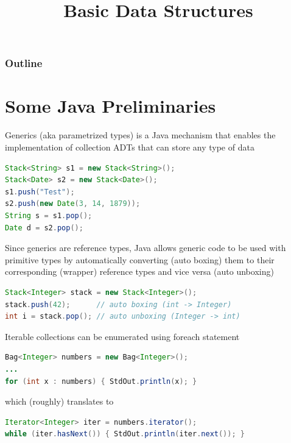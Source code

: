 \documentclass[8pt,a4paper,compress]{beamer}
\title{Basic Data Structures}
\date{}
\begin{document}
\begin{frame}
\vfill
\titlepage
\end{frame}

\begin{frame}
\frametitle{Outline}
\tableofcontents
\end{frame}

\section{Some Java Preliminaries}
\begin{frame}[fragile]
Generics (aka parametrized types) is a Java mechanism that enables the implementation of collection ADTs that can store any type of data

\begin{lstlisting}[language=Java]
Stack<String> s1 = new Stack<String>();
Stack<Date> s2 = new Stack<Date>();
s1.push("Test");
s2.push(new Date(3, 14, 1879));
String s = s1.pop();
Date d = s2.pop();
\end{lstlisting}

\bigskip

Since generics are reference types, Java allows generic code to be used with primitive types by automatically converting (auto boxing) them to their corresponding (wrapper) reference types and vice versa (auto unboxing)
\begin{lstlisting}[language=Java]
Stack<Integer> stack = new Stack<Integer>();
stack.push(42);      // auto boxing (int -> Integer)
int i = stack.pop(); // auto unboxing (Integer -> int)
\end{lstlisting}

\bigskip

Iterable collections can be enumerated using foreach statement 
\begin{lstlisting}[language=Java]
Bag<Integer> numbers = new Bag<Integer>();
...
for (int x : numbers) { StdOut.println(x); }
\end{lstlisting}

which (roughly) translates to 

\begin{lstlisting}[language=Java]
Iterator<Integer> iter = numbers.iterator();
while (iter.hasNext()) { StdOut.println(iter.next()); }
\end{lstlisting}
\end{frame}
\end{document}
